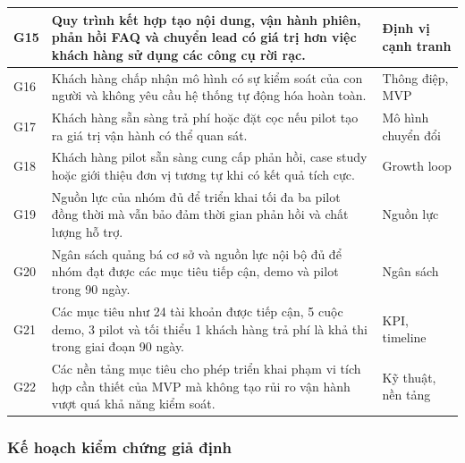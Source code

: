 \begin{longtable}{
    p{}
    p{}
    p{}
}
    \hline

    G15
    &
    Quy trình kết hợp tạo nội dung, vận hành phiên, phản hồi FAQ và chuyển lead có giá trị hơn việc khách hàng sử dụng các công cụ rời rạc.
    &
    Định vị cạnh tranh \\

    \hline

    G16
    &
    Khách hàng chấp nhận mô hình có sự kiểm soát của con người và không yêu cầu hệ thống tự động hóa hoàn toàn.
    &
    Thông điệp, MVP \\

    \hline

    G17
    &
    Khách hàng sẵn sàng trả phí hoặc đặt cọc nếu pilot tạo ra giá trị vận hành có thể quan sát.
    &
    Mô hình chuyển đổi \\

    \hline

    G18
    &
    Khách hàng pilot sẵn sàng cung cấp phản hồi, case study hoặc giới thiệu đơn vị tương tự khi có kết quả tích cực.
    &
    Growth loop \\

    \hline

    G19
    &
    Nguồn lực của nhóm đủ để triển khai tối đa ba pilot đồng thời mà vẫn bảo đảm thời gian phản hồi và chất lượng hỗ trợ.
    &
    Nguồn lực \\

    \hline

    G20
    &
    Ngân sách quảng bá cơ sở và nguồn lực nội bộ đủ để nhóm đạt được các mục tiêu tiếp cận, demo và pilot trong 90 ngày.
    &
    Ngân sách \\

    \hline

    G21
    &
    Các mục tiêu như 24 tài khoản được tiếp cận, 5 cuộc demo, 3 pilot và tối thiểu 1 khách hàng trả phí là khả thi trong giai đoạn 90 ngày.
    &
    KPI, timeline \\

    \hline

    G22
    &
    Các nền tảng mục tiêu cho phép triển khai phạm vi tích hợp cần thiết của MVP mà không tạo rủi ro vận hành vượt quá khả năng kiểm soát.
    &
    Kỹ thuật, nền tảng \\

    \hline
\end{longtable}

\subsubsection{Kế hoạch kiểm chứng giả định}

